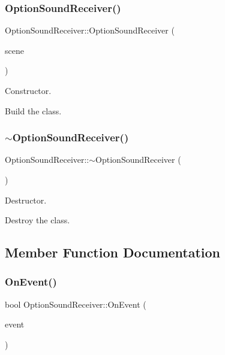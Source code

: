 \subsubsection{\texorpdfstring{Option\+Sound\+Receiver()}{OptionSoundReceiver()}}
{\footnotesize\ttfamily Option\+Sound\+Receiver\+::\+Option\+Sound\+Receiver (\begin{DoxyParamCaption}\item[{\hyperlink{classOptionSoundScene}{Option\+Sound\+Scene} $\ast$}]{scene }\end{DoxyParamCaption})}



Constructor. 

Build the class. \mbox{\label{classOptionSoundReceiver_aca3553e7a1777ed7e39111325b09954a}} 
\subsubsection{\texorpdfstring{$\sim$\+Option\+Sound\+Receiver()}{~OptionSoundReceiver()}}
{\footnotesize\ttfamily Option\+Sound\+Receiver\+::$\sim$\+Option\+Sound\+Receiver (\begin{DoxyParamCaption}{ }\end{DoxyParamCaption})}



Destructor. 

Destroy the class. 

\subsection{Member Function Documentation}
\mbox{\label{classOptionSoundReceiver_ae7c9643b12df38a45d4e3d629274019c}} 
\subsubsection{\texorpdfstring{On\+Event()}{OnEvent()}}
{\footnotesize\ttfamily bool Option\+Sound\+Receiver\+::\+On\+Event (\begin{DoxyParamCaption}\item[{const irr\+::\+S\+Event \&}]{event }\end{DoxyParamCaption})}



